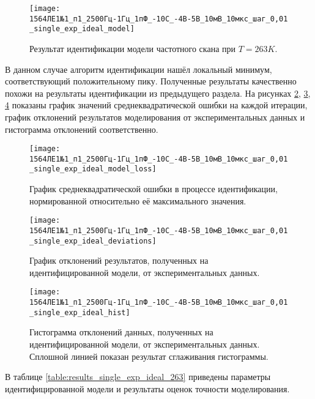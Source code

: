 	\begin{figure}[!htp]
		\centering
		\texttt{[image: 1564ЛЕ1№1\_п1\_2500Гц-1Гц\_1пФ\_-10С\_-4В-5В\_10мВ\_10мкс\_шаг\_0,01\_single\_exp\_ideal\_model]}
		\caption{Результат идентификации модели частотного скана при $T=263K$.}
		\label{pic:model_single_exp_ideal_263}
	\end{figure}

	В данном случае алгоритм идентификации нашёл локальный минимум, 
	соответствующий положительному пику. Полученные результаты качественно похожи
	на результаты идентификации из предыдущего раздела. На рисунках 
	\ref{pic:loss_single_exp_ideal_263}, \ref{pic:deviations_single_exp_ideal_263},
	\ref{pic:hist_single_exp_ideal_263} показаны график значений 
	среднеквадратической ошибки на каждой итерации, график отклонений результатов
	моделирования от экспериментальных данных и гистограмма отклонений соответственно.

	\begin{figure}[!htp]
		\centering
		\texttt{[image: 1564ЛЕ1№1\_п1\_2500Гц-1Гц\_1пФ\_-10С\_-4В-5В\_10мВ\_10мкс\_шаг\_0,01\_single\_exp\_ideal\_model\_loss]}
		\caption{График среднеквадратической ошибки в процессе идентификации,
		         нормированной относительно её максимального значения.}
		\label{pic:loss_single_exp_ideal_263}
	\end{figure}

	\begin{figure}[!htp]
		\centering
		\texttt{[image: 1564ЛЕ1№1\_п1\_2500Гц-1Гц\_1пФ\_-10С\_-4В-5В\_10мВ\_10мкс\_шаг\_0,01\_single\_exp\_ideal\_deviations]}
		\caption{График отклонений результатов, полученных на идентифицированной
		модели, от экспериментальных данных.}
		\label{pic:deviations_single_exp_ideal_263}
	\end{figure}

	\begin{figure}[!htp]
		\centering
		\texttt{[image: 1564ЛЕ1№1\_п1\_2500Гц-1Гц\_1пФ\_-10С\_-4В-5В\_10мВ\_10мкс\_шаг\_0,01\_single\_exp\_ideal\_hist]}
		\caption{Гистограмма отклонений данных, полученных на идентифицированной 
		         модели, от экспериментальных данных. Сплошной линией показан 
		         результат сглаживания гистограммы.}
		\label{pic:hist_single_exp_ideal_263}
	\end{figure}

	В таблице \ref{table:results_single_exp_ideal_263} приведены параметры 
	идентифицированной модели и результаты оценок точности моделирования.

